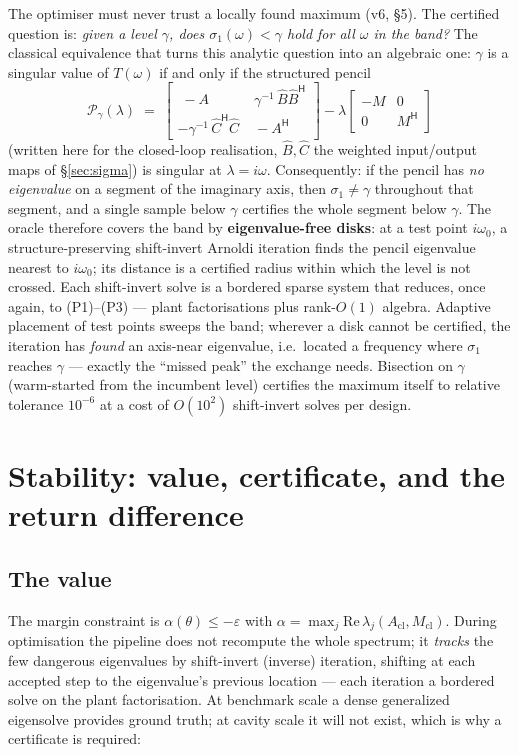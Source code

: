\documentclass[11pt,a4paper]{article}
\newcommand{\eps}{\varepsilon}
\newcommand{\Mcl}{M_{\mathrm{cl}}}
\newcommand{\Acl}{A_{\mathrm{cl}}}
\newcommand{\hp}{^{\mathsf H}}
\begin{document}
{The optimiser must never trust a locally found maximum (v6, \S5).  The certified question
is: \emph{given a level $\gamma$, does $\sigma_1(\omega)<\gamma$ hold for all $\omega$ in
the band?}  The classical equivalence that turns this analytic question into an algebraic
one: $\gamma$ is a singular value of $T(\omega)$ if and only if the structured pencil
\begin{equation}
\boxed{\;
\mathcal P_\gamma(\lambda)\;=\;
\begin{bmatrix} \; -A & \;\gamma^{-1}\,\hat B\hat B\hp \\[2pt]
 -\gamma^{-1}\,\hat C\hp\hat C & \;-A\hp \end{bmatrix}
-\lambda
\begin{bmatrix} -M & 0\\ 0 & M\hp\end{bmatrix}
\;}
\label{eq:pencil}
\end{equation}
(written here for the closed-loop realisation, $\hat B,\hat C$ the weighted input/output
maps of \S\ref{sec:sigma}) is singular at $\lambda=i\omega$.  Consequently: if the pencil
has \emph{no eigenvalue} on a segment of the imaginary axis, then $\sigma_1\ne\gamma$
throughout that segment, and a single sample below $\gamma$ certifies the whole segment
below $\gamma$.  The oracle therefore covers the band by \textbf{eigenvalue-free disks}:
at a test point $i\omega_0$, a structure-preserving shift-invert Arnoldi iteration finds
the pencil eigenvalue nearest to $i\omega_0$; its distance is a certified radius within
which the level is not crossed.  Each shift-invert solve is a bordered sparse system that
reduces, once again, to (P1)--(P3) --- plant factorisations plus rank-$O(1)$ algebra.
Adaptive placement of test points sweeps the band; wherever a disk cannot be certified,
the iteration has \emph{found} an axis-near eigenvalue, i.e.\ located a frequency where
$\sigma_1$ reaches $\gamma$ --- exactly the ``missed peak'' the exchange needs.  Bisection
on $\gamma$ (warm-started from the incumbent level) certifies the maximum itself to
relative tolerance $10^{-6}$ at a cost of $O(10^2)$ shift-invert solves per design.

\section{Stability: value, certificate, and the return difference}
\label{sec:winding}

\subsection{The value}
The margin constraint is $\alpha(\theta)\le-\eps$ with
$\alpha=\max_j\mathrm{Re}\,\lambda_j(\Acl,\Mcl)$.  During optimisation the pipeline does
not recompute the whole spectrum; it \emph{tracks} the few dangerous eigenvalues by
shift-invert (inverse) iteration, shifting at each accepted step to the eigenvalue's
previous location --- each iteration a bordered solve on the plant factorisation.  At
benchmark scale a dense generalized eigensolve provides ground truth; at cavity scale it
will not exist, which is why a certificate is required:

}
\end{document}
